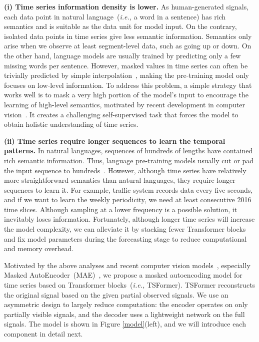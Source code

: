\documentclass[sigconf]{acmart}
\newcommand{\ie}{\textit{i.e.,}\xspace}
\begin{document}
\textbf{(i) Time series information density is lower.} 
As human-generated signals, each data point in natural language~(\ie a word in a sentence) has rich semantics and is suitable as the data unit for model input.
On the contrary, isolated 
{\fontsize{8.8pt}{\baselineskip}\selectfont 
data points in time series} give less semantic information. 
Semantics only arise when we observe at least segment-level data, such as going up or down.
On the other hand, language models are usually trained by predicting only a few missing words per sentence.
However, masked values in time series can often be trivially predicted by simple interpolation~\cite{2021KDD_Transformer}, making the pre-training model only focuses on low-level information.
To address this problem, a simple strategy that works well is to mask a very high portion of the model's input to encourage the learning of high-level semantics, motivated by recent development in computer vision~\cite{2021MAE}. 
It creates a challenging self-supervised task that forces the model to obtain holistic understanding of time series.

\textbf{(ii) Time series require longer sequences to learn the temporal patterns.}
In natural languages, sequences of hundreds of lengths have contained rich semantic information.
Thus, language pre-training models usually cut or pad the input sequence to hundreds~\cite{2018ELMO, 2020GPT, 2019BERT}.
However, although time series have relatively more straightforward semantics than natural languages, they require longer sequences to learn it. For example, traffic system records data every five seconds, and if we want to learn the weekly periodicity, we need at least consecutive 2016 time slices. 
Although sampling at a lower frequency is a possible solution, it inevitably loses information.
Fortunately, although longer time series will increase the model complexity, we can alleviate it by stacking fewer Transformer blocks and fix model parameters during the forecasting stage to reduce computational and memory overhead.


Motivated by the above analyses and recent computer vision models~\cite{2020ViT}, especially Masked AutoEncoder~(MAE)~\cite{2021MAE}, we propose a masked autoencoding model for time series based on Transformer blocks~(\ie TSFormer).
TSFormer reconstructs the original signal based on the given partial observed signals.
We use an asymmetric design to largely reduce computation: the encoder operates on only partially visible signals, and the decoder uses a lightweight network on the full signals.
The model is shown in Figure \ref{model}(left), and we will introduce each component in detail next.
\end{document}
